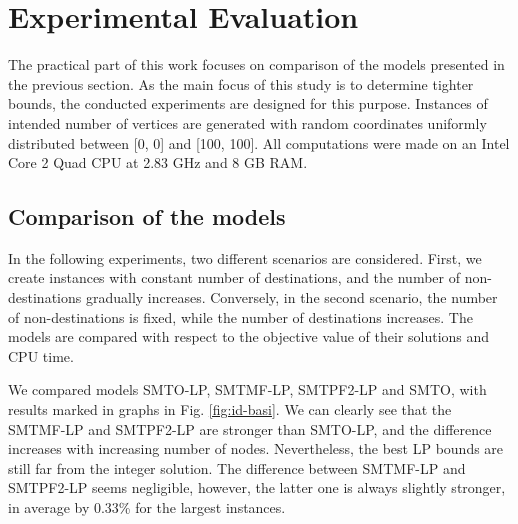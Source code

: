\section{Experimental Evaluation}
\label{sec:exp}
The practical part of this work focuses on comparison of the models presented in the previous section. As the main focus of this study is to determine tighter bounds, the conducted experiments are designed for this purpose. Instances of intended number of vertices are generated with random coordinates uniformly distributed between [0, 0] and [100, 100]. All computations were made on an Intel Core 2 Quad CPU at 2.83 GHz and 8 GB RAM.


\subsection{Comparison of the models}

In the following experiments, two different scenarios are considered. First, we create instances with constant number of destinations, and the number of non-destinations gradually increases. Conversely, in the second scenario, the number of non-destinations is fixed, while the number of destinations increases. The models are compared with respect to the objective value of their solutions and CPU time.

We compared models SMTO-LP, SMTMF-LP, SMTPF2-LP and SMTO, with results marked in graphs in Fig. \ref{fig:id-basi}. We can clearly see that the SMTMF-LP and SMTPF2-LP are stronger than SMTO-LP, and the difference increases with increasing number of nodes. Nevertheless, the best LP bounds are still far from the integer solution. The difference between SMTMF-LP and SMTPF2-LP seems negligible, however, the latter one is always slightly stronger, in average by 0.33\% for the largest instances. 

